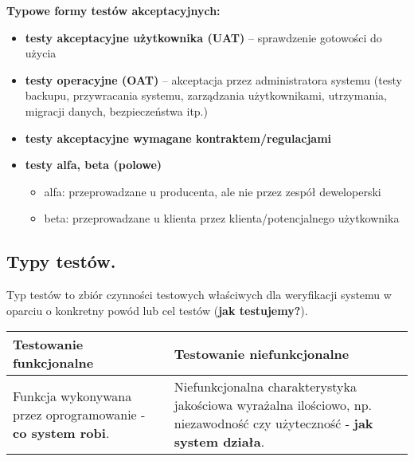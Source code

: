 \documentclass[../main.tex]{subfiles}
\begin{document}
    \textbf{Typowe formy testów akceptacyjnych:}
    \begin{itemize}
        \item \textbf{testy akceptacyjne użytkownika (UAT)} – sprawdzenie gotowości do użycia
        \item \textbf{testy operacyjne (OAT)} – akceptacja przez administratora systemu (testy
        backupu, przywracania systemu, zarządzania użytkownikami, utrzymania,
        migracji danych, bezpieczeństwa itp.)
        \item \textbf{testy akceptacyjne wymagane kontraktem/regulacjami}
        \item \textbf{testy alfa, beta (polowe)}
        \begin{itemize}
            \item alfa: przeprowadzane u producenta, ale nie przez zespół deweloperski
            \item beta: przeprowadzane u klienta przez klienta/potencjalnego użytkownika
        \end{itemize}
    \end{itemize}


    \subsection{Typy testów.}

    Typ testów to zbiór czynności testowych właściwych dla weryfikacji systemu
    w oparciu o konkretny powód lub cel testów (\textbf{jak testujemy?}).

    \begin{table}[H]
        \begin{center}
            \begin{tabular}{| p{8cm}| p{8cm}|}
                \hline
                \textbf{Testowanie funkcjonalne} & \textbf{Testowanie niefunkcjonalne}\\
                \hline
                Funkcja wykonywana przez oprogramowanie - \textbf{co system robi}.
                &
                Niefunkcjonalna charakterystyka jakościowa wyrażalna ilościowo, np. niezawodność
                czy użyteczność - \textbf{jak system działa}.\\
                \hline
            \end{tabular}
        \end{center}
    \end{table}
\end{document}
